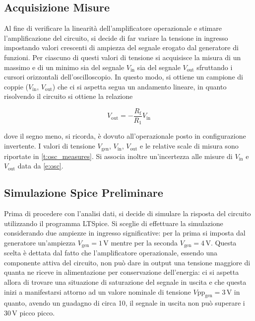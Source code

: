 \documentclass[a4paper,11pt]{article} %
\begin{document}

\subsection{Acquisizione Misure}
Al fine di verificare la linearità dell'amplificatore operazionale e stimare l'amplificazione del circuito, si decide di
far variare la tensione in ingresso impostando valori crescenti di ampiezza del segnale erogato dal generatore di
funzioni. Per ciascuno di questi valori di tensione si acquisisce la misura di un massimo e di un minimo sia del segnale
$V_{\text{in}}$ sia del segnale $V_{\text{out}}$ sfruttando i cursori orizzontali dell'oscilloscopio. In questo modo, si
ottiene un campione di coppie ($V_{\text{in}}$, $V_{\text{out}}$) che ci si aspetta segua un andamento lineare, in
quanto risolvendo il circuito si ottiene la relazione 

\begin{equation}
	V_{\text{out}}=-\frac{R_{\text{f}}}{R_{1}}V_{\text{in}}
\end{equation}

\noindent dove il segno meno, si ricorda, è dovuto all'operazionale posto in configurazione invertente. I valori di
tensione $V_{\text{gen}}$, $V_{\text{in}}$, $V_{\text{out}}$ e le relative scale di misura sono riportate in
\autoref{t:osc_measures}. Si associa inoltre un'incertezza alle misure di $V_{\text{in}}$ e $V_{\text{out}}$ data da
\autoref{e:osc}.\\


\subsection{Simulazione Spice Preliminare}\label{s:spice} Prima di procedere con l'analisi dati, si decide di simulare
la risposta del circuito utilizzando il programma LTSpice. Si sceglie di effettuare la simulazione considerando due
ampiezze in ingresso significative: per la prima si imposta dal generatore un'ampiezza $V_{\text{gen}}=1\,\si{\volt}$
mentre per la seconda $V_{\text{gen}}=4\,\si{\volt}$. Questa scelta è dettata dal fatto che l'amplificatore
operazionale, essendo una componente attiva del circuito, non può dare in output una tensione maggiore di quanta ne
riceve in alimentazione per conservazione dell'energia: ci si aspetta allora di trovare una situazione di saturazione
del segnale in uscita e che questa inizi a manifestarsi attorno ad un valore nominale di tensione
$V\text{pp}_{\text{gen}}=3\,\si{\volt}$ in quanto, avendo un guadagno di circa 10, il segnale in uscita non può superare
i $30\,\si{\volt}$ picco picco.
\end{document}
